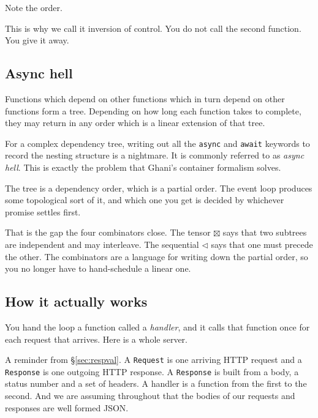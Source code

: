 \documentclass[11pt,a4paper]{article}
\begin{document}
Note the order.

This is why we call it inversion of control. You do not call the second function. You give it
away.

\subsection{Async hell}
\label{sec:asynchell}

\begin{sectionbox}
Functions which depend on other functions which in turn depend on other functions form a tree.
Depending on how long each function takes to complete, they may return in any order which is a
linear extension of that tree.

For a complex dependency tree, writing out all the \texttt{async} and \texttt{await} keywords to
record the nesting structure is a nightmare. It is commonly referred to as \emph{async hell}.
This is exactly the problem that Ghani's container formalism solves.

The tree is a dependency order, which is a partial order. The event loop produces some
topological sort of it, and which one you get is decided by whichever promise settles first.

That is the gap the four combinators close. The tensor $\boxtimes$ says that two subtrees are
independent and may interleave. The sequential $\lhd$ says that one must precede the other. The
combinators are a language for writing down the partial order, so you no longer have to
hand-schedule a linear one.
\end{sectionbox}

\subsection{How it actually works}

You hand the loop a function called a \emph{handler}, and it calls that function once for each
request that arrives. Here is a whole server.

\begin{orestisbox}
A reminder from \S\ref{sec:respval}. A \texttt{Request} is one arriving HTTP request and a
\texttt{Response} is one outgoing HTTP response. A \texttt{Response} is built from a body, a status
number and a set of headers. A handler is a function from the first to the second. And we are
assuming throughout that the bodies of our requests and responses are well formed JSON.
\end{orestisbox}
\end{document}
